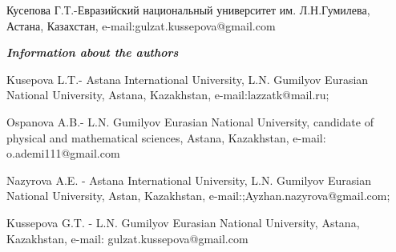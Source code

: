 Кусепова Г.Т.-Евразийский национальный университет им. Л.Н.Гумилева,
Астана, Казахстан, e-mail:gulzat.kussepova@gmail.com

\emph{\textbf{Information about the authors}}

Kusepova L.T.- Astana International University, L.N. Gumilyov Eurasian
National University, Astana, Kazakhstan, e-mail:lazzatk@mail.ru;

Ospanova A.B.- L.N. Gumilyov Eurasian National University, candidate of
physical and mathematical sciences, Astana, Kazakhstan, e-mail:
o.ademi111@gmail.com

Nazyrova A.E. - Astana International University, L.N. Gumilyov Eurasian
National University, Astan, Kazakhstan,
e-mail:;Ayzhan.nazyrova@gmail.com;

Kussepova G.T. - L.N. Gumilyov Eurasian National University, Astana,
Kazakhstan, e-mail: gulzat.kussepova@gmail.com
